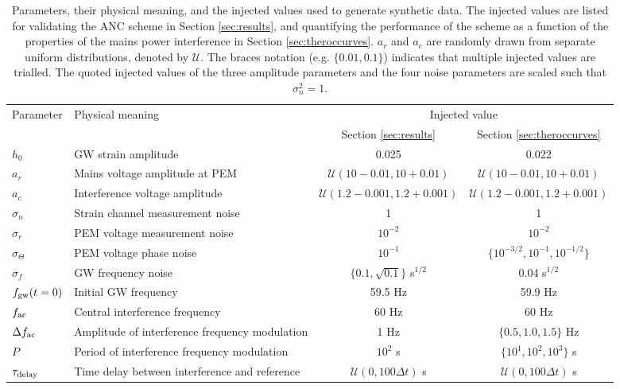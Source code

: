 \documentclass[pra,superscriptaddress,reprint,amsmath,amssymb,nofootinbib]{revtex4-2}
\begin{document}
\begin{table}
	
	\begin{tabular}{llcc}
		\hline 
		
		 \multirow{2}{*}{Parameter} & \multirow{2}{*}{Physical meaning}  & \multicolumn{2}{c}{Injected value} \\
		\cline{3-4}
			 &  &Section \ref{sec:results} & Section \ref{sec:theroccurves}    \\
		\hline
		$h_0$  &    GW strain amplitude & 0.025& 0.022 \\ 
		$a_r$ & Mains voltage amplitude at PEM & $\mathcal{U}(10-0.01,10+0.01)$& $\mathcal{U}(10-0.01,10+0.01)$ \\
		$a_c$ & Interference voltage amplitude &$\mathcal{U}(1.2-0.001,1.2+0.001)$& $\mathcal{U}(1.2-0.001,1.2+0.001)$ \\
		$\sigma_n$ & Strain channel measurement noise &1& 1 \\
		$\sigma_r$  & PEM voltage measurement noise & $10^{-2}$&$10^{-2}$ \\
		$\sigma_{\Theta}$ & PEM voltage phase noise  & $10^{-1}$& $\{ 10^{-3/2}, 10^{-1}, 10^{-1/2}\}$\\
		$\sigma_f$ &  GW frequency noise & $\{0.1,\sqrt{0.1}\}$ s$^{1/2}$& 0.04 s$^{1/2}$\\
		$f_{\rm gw}(t=0)$ &  Initial GW frequency  & 59.5 Hz& 59.9 Hz\\
		$ f_{\rm ac}$ &  Central interference frequency & 60 Hz& 60 Hz\\ 
		$\Delta f_{\rm ac}$ &  Amplitude of interference frequency modulation  & 1 Hz& $\{0.5, 1.0, 1.5\}$ Hz\\
		$P$ & Period of interference frequency modulation & $10^2$ s& $\{ 10^{1}, 10^2, 10^3\}$ s \\
		$\tau_{\rm delay}$ & Time delay between interference and reference & $\mathcal{U}(0,100 \Delta t)$ s& $\mathcal{U}(0,100 \Delta t)$ s \\
		\hline
	\end{tabular} 
	\caption{Parameters, their physical meaning, and the injected values used to generate synthetic data. The injected values are listed for validating the ANC scheme in Section \ref{sec:results}, and quantifying the performance of the scheme as a function of the properties of the mains power interference in Section  \ref{sec:theroccurves}. $a_r$ and $a_c$ are randomly drawn from separate uniform distributions, denoted by $\mathcal{U}$. The braces notation (e.g. $\{0.01, 0.1\}$) indicates that multiple injected values are trialled. The quoted injected values of the three amplitude parameters and the four noise parameters are scaled such that $\sigma_n^2 = 1$.}
	\label{tab:parameterdescription1}
\end{table}
\end{document}
